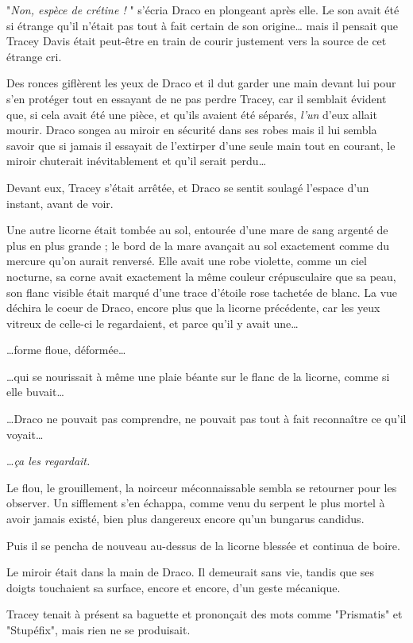 "\emph{Non, espèce de crétine !} " s'écria Draco en plongeant après elle. Le son avait été si étrange qu'il n'était pas tout à fait certain de son origine… mais il pensait que Tracey Davis était peut-être en train de courir justement vers la source de cet étrange cri.

Des ronces giflèrent les yeux de Draco et il dut garder une main devant lui pour s'en protéger tout en essayant de ne pas perdre Tracey, car il semblait évident que, si cela avait été une pièce, et qu'ils avaient été séparés, \emph{l'un}  d'eux allait mourir. Draco songea au miroir en sécurité dans ses robes mais il lui sembla savoir que si jamais il essayait de l'extirper d'une seule main tout en courant, le miroir chuterait inévitablement et qu'il serait perdu…

Devant eux, Tracey s'était arrêtée, et Draco se sentit soulagé l'espace d'un instant, avant de voir.

Une autre licorne était tombée au sol, entourée d'une mare de sang argenté de plus en plus grande ; le bord de la mare avançait au sol exactement comme du mercure qu'on aurait renversé. Elle avait une robe violette, comme un ciel nocturne, sa corne avait exactement la même couleur crépusculaire que sa peau, son flanc visible était marqué d'une trace d'étoile rose tachetée de blanc. La vue déchira le coeur de Draco, encore plus que la licorne précédente, car les yeux vitreux de celle-ci le regardaient, et parce qu'il y avait une…

…forme floue, déformée…

…qui se nourissait à même une plaie béante sur le flanc de la licorne, comme si elle buvait…

…Draco ne pouvait pas comprendre, ne pouvait pas tout à fait reconnaître ce qu'il voyait…

…\emph{ça les regardait.} 

Le flou, le grouillement, la noirceur méconnaissable sembla se retourner pour les observer. Un sifflement s'en échappa, comme venu du serpent le plus mortel à avoir jamais existé, bien plus dangereux encore qu'un bungarus candidus.

Puis il se pencha de nouveau au-dessus de la licorne blessée et continua de boire.

Le miroir était dans la main de Draco. Il demeurait sans vie, tandis que ses doigts touchaient sa surface, encore et encore, d'un geste mécanique.

Tracey tenait à présent sa baguette et prononçait des mots comme "Prismatis" et "Stupéfix", mais rien ne se produisait.

